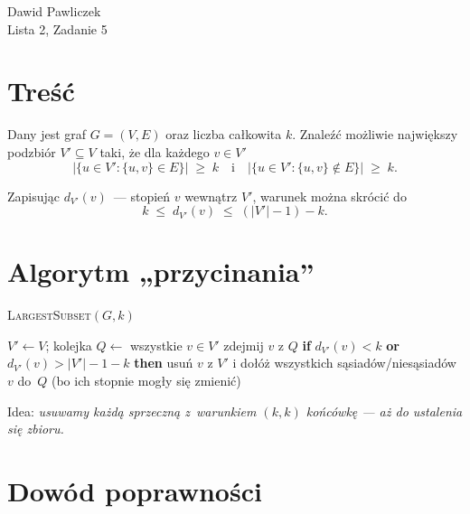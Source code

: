 \documentclass[11pt,a4paper]{article}
\begin{document}
\begin{center}
\Large Dawid Pawliczek\\
Lista 2, Zadanie 5
\end{center}

\bigskip
\section*{Treść}

Dany jest graf $G=(V,E)$ oraz liczba całkowita $k$.
Znaleźć możliwie największy podzbiór
$V'\subseteq V$ taki, że dla każdego $v\in V'$
\[
\bigl|\{u\in V':\{u,v\}\in E\}\bigr|\;\ge\;k
\quad\text{i}\quad
\bigl|\{u\in V':\{u,v\}\notin E\}\bigr|\;\ge\;k.
\]

Zapisując $d_{V'}(v)$~— stopień $v$ wewnątrz $V'$,
warunek można skrócić do
\[
k\;\le\;d_{V'}(v)\;\le\;(|V'|-1)-k.
\]

\section*{Algorytm „przycinania”}

\begin{algorithm}[H]
\caption{\textsc{LargestSubset}$(G,k)$}
\begin{algorithmic}[1]
\State $V'\gets V$; \quad kolejka $Q\gets$ wszystkie $v\in V'$
   \State zdejmij $v$ z $Q$
   \State \textbf{if } $d_{V'}(v)<k$ \textbf{or}
          $d_{V'}(v) > |V'|-1-k$
          \textbf{then}
          usuń $v$ z $V'$ i dołóż wszystkich sąsiadów/niesąsiadów
          $v$ do~$Q$ (bo ich stopnie mogły się zmienić)
\EndWhile
\State {}
\end{algorithmic}
\end{algorithm}

Idea: \emph{usuwamy każdą sprzeczną z~warunkiem $(k,k)$
końcówkę — aż do ustalenia się zbioru.}

\section*{Dowód poprawności}
\end{document}
